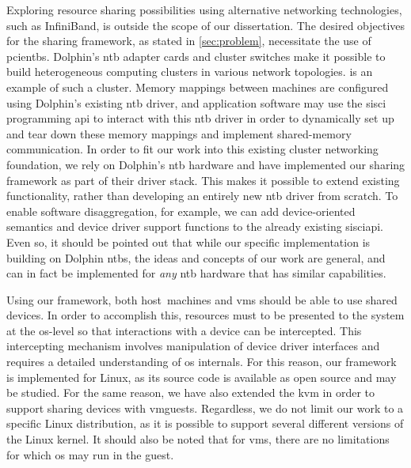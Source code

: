 Exploring resource sharing possibilities using alternative networking technologies, such as InfiniBand, is outside the scope of our dissertation.
%
The desired objectives for the sharing framework, as stated in \cref{sec:problem}, necessitate the use of \glspl{pcientb}. %
%
Dolphin's \gls{ntb} adapter cards and cluster switches make it possible to build heterogeneous computing clusters in various network topologies.
%
 is an example of such a cluster.
%
Memory mappings between machines are configured using Dolphin's existing \gls{ntb} driver, and application software may use the \gls{sisci} programming \gls{api} to interact with this \gls{ntb} driver in order to dynamically set up and tear down these memory mappings and implement shared-memory communication.
%
In order to fit our work into this existing cluster networking foundation, we rely on Dolphin's \gls{ntb} hardware and have implemented our sharing framework as part of their driver stack.
%
This makes it possible to extend existing functionality, rather than developing an entirely new \gls{ntb} driver from scratch.
%
To enable software \gls{disaggregation}, for example, we can add device-oriented semantics and device driver support functions to the already existing \gls{sisciapi}. 
%
Even so, it should be pointed out that while our specific implementation is building on Dolphin \glspl{ntb}, the ideas and concepts of our work are general, and can in fact be implemented for \emph{any} \gls{ntb} hardware that has similar capabilities.



Using our framework, both \gls{host}~machines and \glspl{vm} should be able to use shared devices.
%
In order to accomplish this, resources must to be presented to the system at the \gls{os}-level so that interactions with a device can be intercepted. 
%
This intercepting mechanism involves manipulation of device driver interfaces and requires a detailed understanding of \gls{os} internals.
%
For this reason, our framework is implemented for Linux, as its source code is available as open source and may be studied.
%
For the same reason, we have also extended the \gls{kvm} in order to support sharing devices with \glspl{vmguest}.
%
Regardless, we do not limit our work to a specific Linux distribution, as it is possible to support several different versions of the Linux kernel.
%
It should also be noted that for \glspl{vm}, there are no limitations for which \gls{os} may run in the \gls{guest}.



